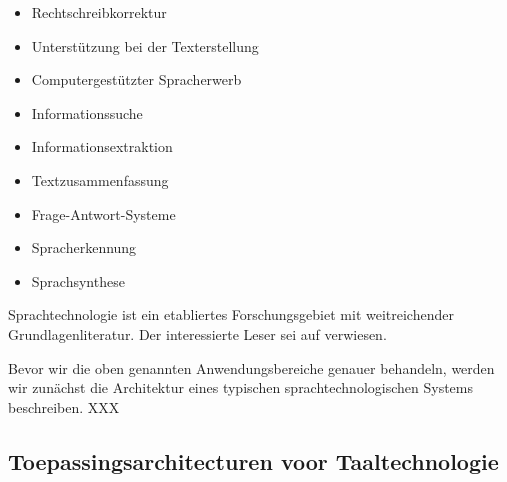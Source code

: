 \documentclass[]{../../metanetpaper}
\begin{document}
\begin{multicols}{2}
\begin{itemize}
\item Rechtschreibkorrektur
\item Unterstützung bei der Texterstellung
\item Computergestützter Spracherwerb
\item Informationssuche
\item Informationsextraktion
\item Textzusammenfassung
\item Frage-Antwort-Systeme
\item Spracherkennung 
\item Sprachsynthese
\end{itemize}

Sprachtechnologie ist ein etabliertes Forschungsgebiet mit weitreichender Grundlagenliteratur. Der interessierte Leser sei auf \cite{carstensen-etal1, jurafsky-martin01, manning-schuetze1, lt-world1, lt-survey1} verwiesen.

Bevor wir die oben genannten Anwendungsbereiche genauer behandeln, werden wir zunächst die Architektur eines typischen sprachtechnologischen Systems beschreiben. 
XXX

\subsection[Toepassingsarchitecturen voor Taaltechnologie]{Toepassingsarchitecturen voor Taaltechnologie}


\end{multicols}
\end{document}
